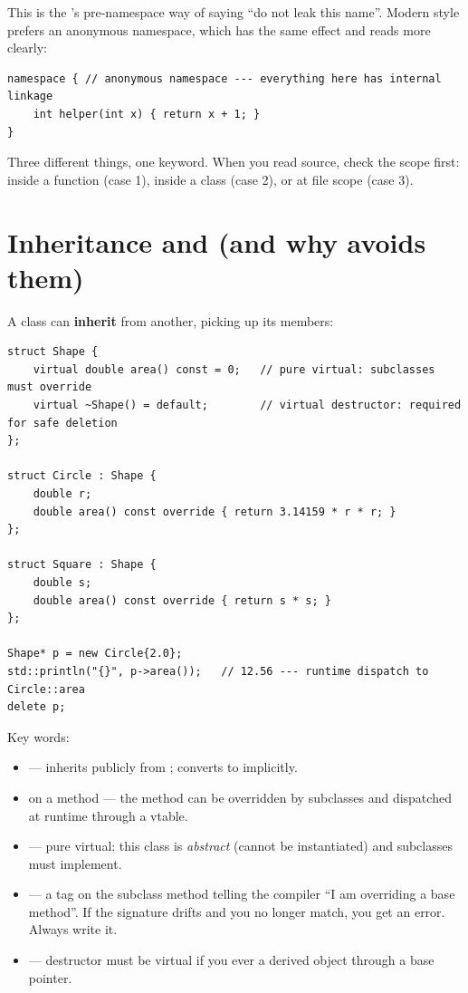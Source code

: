 This is the \cpp{}'s pre-namespace way of saying ``do not leak this
name''. Modern style prefers an anonymous namespace, which has the
same effect and reads more clearly:

\begin{lstlisting}
namespace { // anonymous namespace --- everything here has internal linkage
    int helper(int x) { return x + 1; }
}
\end{lstlisting}

Three different things, one keyword. When you read \maya{} source,
check the scope first: inside a function (case 1), inside a class
(case 2), or at file scope (case 3).

\section{Inheritance and  (and why \maya{} avoids them)}
\label{sec:cpp:inheritance}

A class can \textbf{inherit} from another, picking up its members:

\begin{lstlisting}
struct Shape {
    virtual double area() const = 0;   // pure virtual: subclasses must override
    virtual ~Shape() = default;        // virtual destructor: required for safe deletion
};

struct Circle : Shape {
    double r;
    double area() const override { return 3.14159 * r * r; }
};

struct Square : Shape {
    double s;
    double area() const override { return s * s; }
};

Shape* p = new Circle{2.0};
std::println("{}", p->area());   // 12.56 --- runtime dispatch to Circle::area
delete p;
\end{lstlisting}

Key words:

\begin{itemize}[leftmargin=*]
  \item {} ---  inherits
    publicly from ;  converts to
     implicitly.
  \item {} on a method --- the method can be overridden
    by subclasses and dispatched at runtime through a vtable.
  \item {} --- pure virtual: this class is
    \emph{abstract} (cannot be instantiated) and subclasses must
    implement.
  \item {} --- a tag on the subclass method telling
    the compiler ``I am overriding a base method''. If the signature
    drifts and you no longer match, you get an error. Always
    write it.
  \item {} --- destructor must be virtual
    if you ever  a derived object through a base
    pointer.
\end{itemize}

